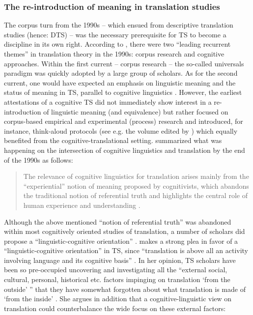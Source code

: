 \subsubsection{The re-introduction of meaning in translation studies}
\label{sec:2.2.3.2}  
The corpus turn from the 1990s – which ensued from descriptive translation studies (hence: DTS) – was the necessary prerequisite for TS to become a discipline in its own right. According to \citet[41]{thelen_translation_2002}, there were two “leading recurrent themes” in translation theory in the 1990s: corpus research and cognitive approaches. Within the first current – corpus research – the so-called universals paradigm was quickly adopted by a large group of scholars. As for the second current, one would have expected an emphasis on linguistic meaning and the status of meaning in TS, parallel to cognitive linguistics \citep[41]{thelen_translation_2002}. However, the earliest attestations of a cognitive TS did not immediately show interest in a re-introduction of linguistic meaning (and equivalence) but rather focused on corpus-based empirical and experimental (process) research and introduced, for instance, think-aloud protocols (see e.g. the volume edited by \citealt{tirkkonen-condit_tapping_2000}) which equally benefited from the cognitive-translational setting. \citet{rojo_cognitive_2013} summarized what was happening on the intersection of cognitive linguistics and translation by the end of the 1990s as follows:

\begin{quote}
The relevance of cognitive linguistics for translation arises mainly from the “experiential” notion of meaning proposed by cognitivists, which abandons the traditional notion of referential truth and highlights the central role of human experience and understanding \citep[7]{rojo_cognitive_2013}.
\end{quote}

Although the above mentioned “notion of referential truth” was abandoned within most cognitively oriented studies of translation, a number of scholars did propose a “linguistic-cognitive orientation” \citep{house_towards_2013}. \citet{house_towards_2013} makes a strong plea in favor of a “linguistic-cognitive orientation” in TS, since “translation is above all an activity involving language and its cognitive basis” \citep[47]{house_towards_2013}. In her opinion, TS scholars have been so pre-occupied uncovering and investigating all the “external social, cultural, personal, historical etc. factors impinging on translation ‘from the outside’ ” that they have somewhat forgotten about what translation is made of ‘from the inside’ \citep[47]{house_towards_2013}. She argues in addition that a cognitive-linguistic view on translation could counterbalance the wide focus on these external factors:

